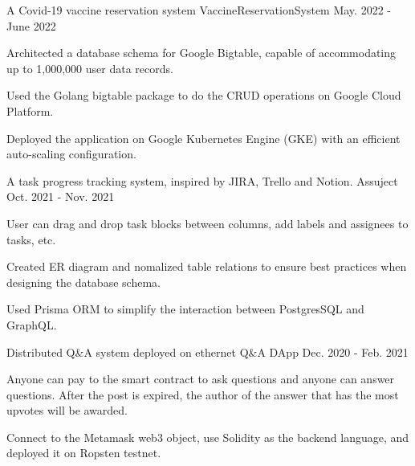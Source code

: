 

\begin{cventries}

  \cventry
  {A Covid-19 vaccine reservation system}
  {VaccineReservationSystem \href{https://github.com/MortalHappiness/VaccineReservationSystem}{\color{red}{[GitHub Link]}}}
  {}
  {May. 2022 - June 2022} %
  {
    \begin{cvitems} %
      \item {Architected a database schema for Google Bigtable, capable of accommodating up to 1,000,000 user data records.}
      \item {Used the Golang bigtable package to do the CRUD operations on Google Cloud Platform.}
      \item {Deployed the application on Google Kubernetes Engine (GKE) with an efficient auto-scaling configuration.}
    \end{cvitems}
  }

  \cventry
  {A task progress tracking system, inspired by JIRA, Trello and Notion.}
  {Assuject \href{https://github.com/MortalHappiness/DBM2021FallMidtermProject}{\color{red}{[GitHub Link]}}}
  {}
  {Oct. 2021 - Nov. 2021} %
  {
    \begin{cvitems} %
      \item {User can drag and drop task blocks between columns, add labels and assignees to tasks, etc.}
      \item {Created ER diagram and nomalized table relations to ensure best practices when designing the database schema.}
      \item {Used Prisma ORM to simplify the interaction between PostgresSQL and GraphQL.}
    \end{cvitems}
  }

  \cventry
  {Distributed Q\&A system deployed on ethernet}
  {Q\&A DApp \href{https://github.com/MortalHappiness/NMLab2020Fall-Final}{\color{red}{[GitHub Link]}}}
  {}
  {Dec. 2020 - Feb. 2021} %
  {
    \begin{cvitems} %
      \item {Anyone can pay to the smart contract to ask questions and anyone can answer questions. After the post is expired, the author of the answer that has the most upvotes will be awarded.}
      \item {Connect to the Metamask web3 object, use Solidity as the backend language, and deployed it on Ropsten testnet.}
    \end{cvitems}
  }


\end{cventries}
